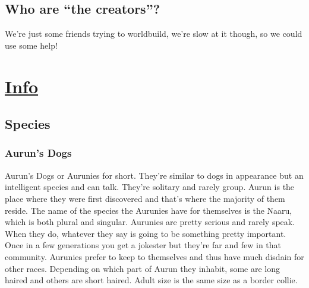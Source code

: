 \documentclass[11pt]{article}
\begin{document}
\subsection*{Who are ``the creators''?}
\label{sec:org2a16939}
We're just some friends trying to worldbuild, we're slow at it though, so we could use some help!


\section*{\underline{Info}}
\label{sec:org2e7904c}
\subsection*{Species}
\label{sec:org3ab5808}
\subsubsection*{Aurun's Dogs}
\label{sec:org7b2e23d}
Aurun's Dogs or Aurunies for short.  They're similar to dogs in appearance but an intelligent species and can talk.  They're solitary and rarely group.  Aurun is the place where they were first discovered and that's where the majority of them reside.  The name of the species the Aurunies have for themselves is the Naaru, which is both plural and singular.
Aurunies are pretty serious and rarely speak.  When they do, whatever they say is going to be something pretty important.  Once in a few generations you get a jokester but they're far and few in that community.  Aurunies prefer to keep to themselves and thus have much disdain for other races.
Depending on which part of Aurun they inhabit, some are long haired and others are short haired.  Adult size is the same size as a border collie.
\end{document}
